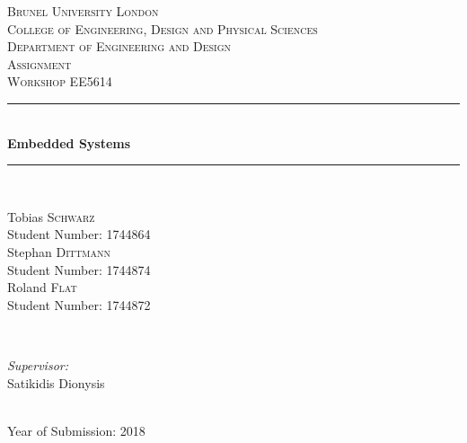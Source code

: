 \documentclass[13pt, a4paper,headinclude, 
footinclude, 
plainfootsepline]{scrreprt} %
\newcommand{\theuniversity}{Brunel University London}
\newcommand{\thecollege}{College of Engineering, Design and Physical Sciences}
\newcommand{\thedepartment}{Department of Engineering and Design}
\newcommand{\thecoursetitle}{Assignment \\ Workshop EE5614}
\newcommand{\thestudent}{Tobias \textsc{Schwarz}}
\newcommand{\thestudentid}{1744864}
\newcommand{\thestudenttwo}{Stephan \textsc{Dittmann}}
\newcommand{\thestudentidtwo}{1744874}
\newcommand{\thestudentthree}{Roland \textsc{Flat}}
\newcommand{\thestudentidthree}{1744872}
\newcommand{\thesupervisor}{Satikidis Dionysis}
\newcommand{\theyear}{2018}
\newcommand{\thetitle}{Embedded Systems}
\theoremstyle{plain}
\theoremstyle{definition}
\begin{document}
	
	
	
\onehalfspacing


\begin{titlepage}
	\center
	
	\textsc{\LARGE \theuniversity} \\[1.5cm] 
	\textsc{\large 
		\thecollege \\
		\thedepartment} \\[1.5cm]
	\textsc{\Large \thecoursetitle} \\[3.0cm]
	
	\rule{\linewidth}{0.5mm} \\[0.5cm]
	{ \huge\textbf{ \thetitle } } \\
	\rule{\linewidth}{0.5mm} \\[5cm]
	
	\begin{minipage}{0.4\textwidth}
		\begin{flushleft} \large
			\thestudent \\
			Student Number: \thestudentid \\
			\thestudenttwo \\
			Student Number: \thestudentidtwo \\
			\thestudentthree \\
			Student Number: \thestudentidthree
		\end{flushleft}
	\end{minipage}
	~
	\begin{minipage}{0.4\textwidth}
		\begin{flushright} \large
			\emph{Supervisor:} \\
			\thesupervisor
		\end{flushright}
	\end{minipage}\\[1cm]
	
	{\large Year of Submission: \theyear} \\[3cm] 
	
	\vfill %
\end{titlepage}
\newpage

\end{document}
